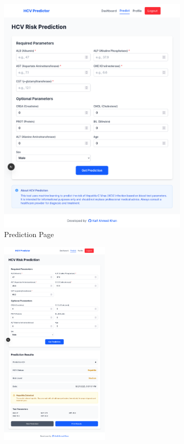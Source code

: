 \begin{figure}[htbp]
  \begin{subfigure}{0.5\textwidth}
    \includegraphics[width=\textwidth]{figures/site/predict.png} 
    \caption{Prediction Page}
    \label{fig:subim1}
  \end{subfigure}
  \begin{subfigure}{0.5\textwidth}
    \includegraphics[width=\textwidth, height=10cm]{figures/site/prediction02.png}

\end{subfigure}
\end{figure}
